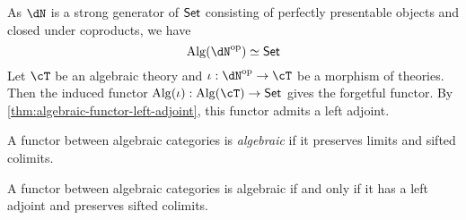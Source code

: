 \documentclass{zett}
\begin{document}
\begin{eg}
  As $\dN$ is a strong generator of $\mathsf{Set}$ consisting of perfectly presentable objects and closed under coproducts, we have
  \[
    \Alg(\dN\op) \eqv \CSet
  \]
  Let $\cT$ be an algebraic theory and $\iota : \dN\op \to \cT$ be a morphism of theories.
  Then the induced functor $\Alg(\iota) : \Alg(\cT) \to \CSet$ gives the forgetful functor.
  By \cref{thm:algebraic-functor-left-adjoint}, this functor admits a left adjoint.
\end{eg}

\begin{defn}
  A functor between algebraic categories is \emph{algebraic} if it preserves limits and sifted colimits.
\end{defn}

\begin{thm}\label{thm:alg-functors-left-adjoint}
  A functor between algebraic categories is algebraic if and only if it has a left adjoint and preserves sifted colimits.
\end{thm}
\end{document}
